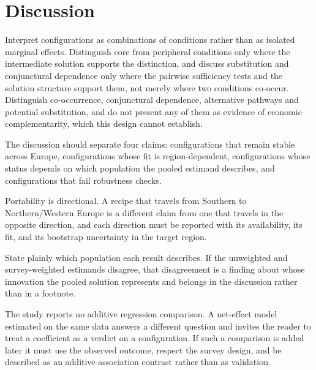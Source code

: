 \section{Discussion}

Interpret configurations as combinations of conditions rather than as isolated
marginal effects. Distinguish core from peripheral conditions only where the
intermediate solution supports the distinction, and discuss substitution and
conjunctural dependence only where the pairwise sufficiency tests and the
solution structure support them, not merely where two conditions co-occur.
Distinguish co-occurrence, conjunctural dependence, alternative pathways and
potential substitution, and do not present any of them as evidence of economic
complementarity, which this design cannot establish.

The discussion should separate four claims: configurations that remain stable
across Europe, configurations whose fit is region-dependent, configurations
whose status depends on which population the pooled estimand describes, and
configurations that fail robustness checks.

Portability is directional. A recipe that travels from Southern to
Northern/Western Europe is a different claim from one that travels in the
opposite direction, and each direction must be reported with its availability,
its fit, and its bootstrap uncertainty in the target region.

State plainly which population each result describes. If the unweighted and
survey-weighted estimands disagree, that disagreement is a finding about whose
innovation the pooled solution represents and belongs in the discussion rather
than in a footnote.

The study reports no additive regression comparison. A net-effect model
estimated on the same data answers a different question and invites the reader
to treat a coefficient as a verdict on a configuration. If such a comparison is
added later it must use the observed outcome, respect the survey design, and be
described as an additive-association contrast rather than as validation.
